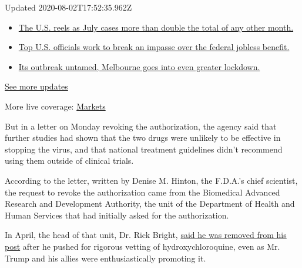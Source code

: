 Updated 2020-08-02T17:52:35.962Z

\begin{itemize}
\tightlist
\item
  \href{https://www.nytimes.com/2020/08/01/world/coronavirus-covid-19.html?action=click\&pgtype=Article\&state=default\&region=MAIN_CONTENT_1\&context=storylines_live_updates\#link-34047410}{The
  U.S. reels as July cases more than double the total of any other
  month.}
\item
  \href{https://www.nytimes.com/2020/08/01/world/coronavirus-covid-19.html?action=click\&pgtype=Article\&state=default\&region=MAIN_CONTENT_1\&context=storylines_live_updates\#link-780ec966}{Top
  U.S. officials work to break an impasse over the federal jobless
  benefit.}
\item
  \href{https://www.nytimes.com/2020/08/01/world/coronavirus-covid-19.html?action=click\&pgtype=Article\&state=default\&region=MAIN_CONTENT_1\&context=storylines_live_updates\#link-2bc8948}{Its
  outbreak untamed, Melbourne goes into even greater lockdown.}
\end{itemize}

\href{https://www.nytimes.com/2020/08/01/world/coronavirus-covid-19.html?action=click\&pgtype=Article\&state=default\&region=MAIN_CONTENT_1\&context=storylines_live_updates}{See
more updates}

More live coverage:
\href{https://www.nytimes.com/live/2020/07/31/business/stock-market-today-coronavirus?action=click\&pgtype=Article\&state=default\&region=MAIN_CONTENT_1\&context=storylines_live_updates}{Markets}

But in a letter on Monday revoking the authorization, the agency said
that further studies had shown that the two drugs were unlikely to be
effective in stopping the virus, and that national treatment guidelines
didn't recommend using them outside of clinical trials.

According to the letter, written by Denise M. Hinton, the F.D.A.'s chief
scientist, the request to revoke the authorization came from the
Biomedical Advanced Research and Development Authority, the unit of the
Department of Health and Human Services that had initially asked for the
authorization.

In April, the head of that unit, Dr. Rick Bright,
\href{https://www.nytimes.com/2020/04/22/us/politics/rick-bright-trump-hydroxychloroquine-coronavirus.html}{said
he was removed from his post} after he pushed for rigorous vetting of
hydroxychloroquine, even as Mr. Trump and his allies were
enthusiastically promoting it.

